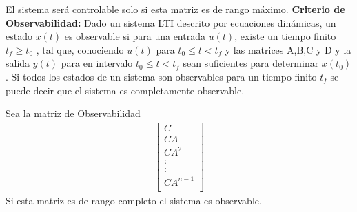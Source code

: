 \documentclass[12pt]{article}
\begin{document}
El sistema será controlable solo si esta matriz es de rango máximo.
\vspace{5mm}
\textbf{Criterio de Observabilidad:}
\vspace{5mm}
Dado un sistema LTI descrito por ecuaciones dinámicas, un estado $x(t)$ es observable si para una entrada $u(t)$, existe un tiempo finito $t_{f}\geq t_{0}$ , tal que, conociendo $u(t)$ para $t_{0}\leq t<t_{f}$ y las matrices A,B,C y D y la salida $y(t)$ para en intervalo $t_{0}\leq t<t_{f}$ sean suficientes para determinar $x(t_{0})$. Si todos los estados de un sistema son observables para un tiempo finito $t_{f}$ se puede decir que el sistema es completamente observable.

Sea la matriz de Observabilidad 
\begin{equation}
    \begin{split}
        \begin{bmatrix}
            C \\
            CA \\
            CA^2 \\
            : \\
            : \\
            CA^{n-1} \\
        \end{bmatrix}
        \label{eq:matriz_observ}
    \end{split}
\end{equation}
Si esta matriz es de rango completo el sistema es observable.
\end{document}
